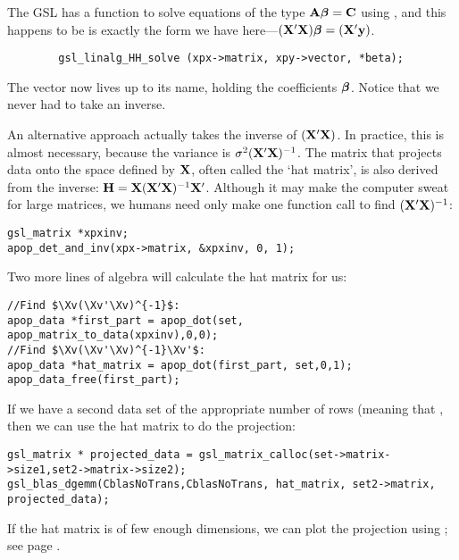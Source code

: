 The GSL has a function to solve equations of the type ${\bf A} {\mbox{\boldmath$\beta$}} =
{\bf C}$ using , and this happens to be is exactly the form we have here---$({\bf X}'{\bf X}){\mbox{\boldmath$\beta$}} = ({\bf X}'{\bf y})$.  \label{ols}
\begin{lstlisting}
        gsl_linalg_HH_solve (xpx->matrix, xpy->vector, *beta);
\end{lstlisting}

The vector  now lives up to its name, holding the coefficients
${\mbox{\boldmath$\beta$}}$. Notice that we never had to take an inverse.  

An alternative approach actually takes the inverse of $({\bf X}'{\bf X})$. In practice, this is
almost necessary, because the variance is $\sigma^2 ({\bf X}'{\bf X})^{-1}$.
The matrix that projects data onto the space defined by ${\bf X}$,
often called the `hat matrix', is also derived from the inverse: ${\bf H} = {\bf X}({\bf X}'{\bf X})^{-1}{\bf X}'$. Although it may
make the computer sweat for large matrices, we humans need only make one
function call to find $({\bf X}'{\bf X})^{-1}$:
\begin{lstlisting}
gsl_matrix *xpxinv;
apop_det_and_inv(xpx->matrix, &xpxinv, 0, 1);
\end{lstlisting}
Two more lines of algebra will calculate the hat matrix for us: 
\lstset{texcl=true}
\begin{lstlisting}
//Find $\Xv(\Xv'\Xv)^{-1}$:
apop_data *first_part = apop_dot(set, apop_matrix_to_data(xpxinv),0,0);
//Find $\Xv(\Xv'\Xv)^{-1}\Xv'$:
apop_data *hat_matrix = apop_dot(first_part, set,0,1);
apop_data_free(first_part);
\end{lstlisting}
\lstset{texcl=false} %

If we have a second data set  of the appropriate number of
rows (meaning that , then we can use the hat matrix to do the projection:\\
\begin{lstlisting}
gsl_matrix * projected_data = gsl_matrix_calloc(set->matrix->size1,set2->matrix->size2);
gsl_blas_dgemm(CblasNoTrans,CblasNoTrans, hat_matrix, set2->matrix, projected_data);
\end{lstlisting}
If the hat matrix is of few enough dimensions, we can plot the
projection using ; see page \pageref{gnuprint}.


